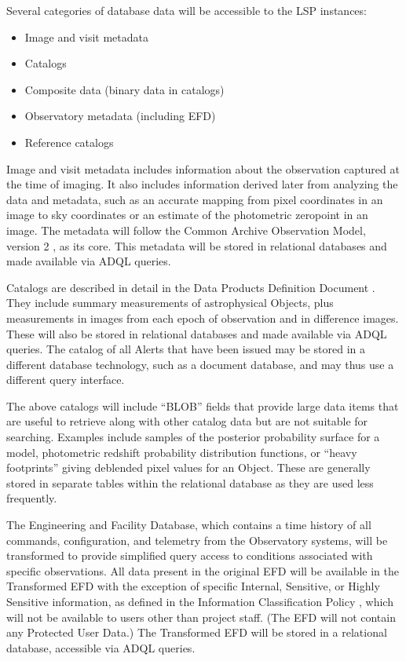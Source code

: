 Several categories of database data will be accessible to the LSP instances:
\begin{itemize}
\item Image and visit metadata
\item Catalogs
\item Composite data (binary data in catalogs)
\item Observatory metadata (including EFD)
\item Reference catalogs
\end{itemize}

Image and visit metadata includes information about the observation captured at
the time of imaging.
It also includes information derived later from analyzing the data
and metadata, such as an accurate mapping from pixel coordinates in an image to
sky coordinates or an estimate of the photometric zeropoint in an image.
The metadata will follow the Common Archive Observation 
Model, version 2 \citep{2012ASPC..461..339D,CAOM2}, as its core.
This metadata will be stored in relational databases and made available
via ADQL queries.

Catalogs are described in detail in the Data Products Definition Document
.  They include summary measurements of astrophysical Objects,
plus measurements in images from each epoch of observation and in difference
images.  These will also be stored in relational databases and made available
via ADQL queries.  The catalog of all Alerts that have been issued may be
stored in a different database technology, such as a document database, and
may thus use a different query interface.

The above catalogs will include ``BLOB'' fields that provide large data items
that are useful to retrieve along with other catalog data but are not
suitable for searching.  Examples include samples of the posterior probability
surface for a model, photometric redshift probability distribution functions,
or ``heavy footprints'' giving deblended pixel values for an Object.  These
are generally stored in separate tables within the relational database as
they are used less frequently.

The Engineering and Facility Database, which contains a time history of all
commands, configuration, and telemetry from the Observatory systems, will
be transformed to provide simplified query access to conditions associated
with specific observations.
All data present in the original EFD will be available in the Transformed EFD
with the exception of specific Internal, Sensitive, or Highly Sensitive
information, as defined in the Information Classification Policy
,
which will not be available to users other than project staff.
(The EFD will not contain any Protected User Data.)
The Transformed EFD will be stored in a relational database, 
accessible via ADQL queries.

